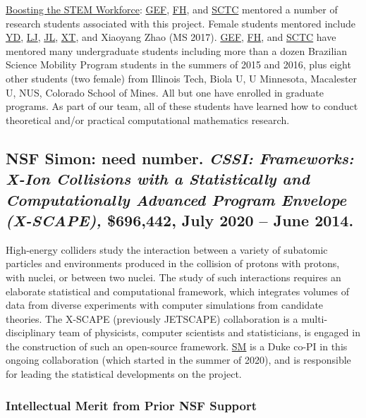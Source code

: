 \documentclass[11pt]{NSFamsart}
\newcommand{\Upara}[1]{\noindent\underline{#1}:\xspace}
\newcommand{\FH}{\hyperlink{FHlink}{FH}\xspace}
\newcommand{\SM}{\hyperlink{SMlink}{SM}\xspace}
\newcommand{\SCTC}{\hyperlink{SCTClink}{SCTC}\xspace}
\newcommand{\GEF}{\hyperlink{GEFlink}{GEF}\xspace}
\newcommand{\YD}{\hyperlink{YDlink}{YD}\xspace}
\newcommand{\LJ}{\hyperlink{LJlink}{LJ}\xspace}
\newcommand{\XT}{\hyperlink{XTlink}{XT}\xspace}
\newcommand{\JL}{\hyperlink{JLlink}{JL}\xspace}
\newcommand{\SMNote}[1]{{\color{blue}Simon: #1}}
\begin{document}
\Upara{Boosting the STEM Workforce} \GEF, \FH, and \SCTC mentored a number of 
research students associated with this project.  Female students mentored include \YD, \LJ, \JL, \XT, and Xiaoyang Zhao (MS 2017).   \GEF, \FH,  and \SCTC have mentored many undergraduate students including more than a dozen 
Brazilian Science Mobility Program students in the summers of 2015 and 2016, plus eight other students (two female) from Illinois Tech, Biola U, U Minnesota, Macalester U, NUS, Colorado School of Mines.  All but one have enrolled in graduate programs.   As part of our team, all of
these students have learned how to conduct theoretical and/or practical computational mathematics research.

\subsection{NSF \SMNote{need number}. \textit{CSSI: Frameworks: X-Ion Collisions with a Statistically and Computationally Advanced Program Envelope (X-SCAPE),} \$696,442, July 2020 -- June 2014.} High-energy colliders study the interaction between a variety of subatomic particles and environments produced in the collision of protons with protons, with nuclei, or between two nuclei. The study of such interactions requires an elaborate statistical and computational framework, which integrates volumes of data from diverse experiments with computer simulations from candidate theories. The X-SCAPE (previously JETSCAPE) collaboration is a multi-disciplinary team of physicists, computer scientists and statisticians, is engaged in the construction of such an open-source framework. \SM is a Duke co-PI in this ongoing collaboration (which started in the summer of 2020), and is responsible for leading the statistical developments on the project.

\subsubsection{Intellectual Merit from Prior NSF Support}
\end{document}
